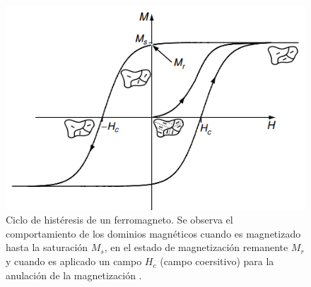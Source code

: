 \begin{figure}[!htp]
    \centering
    \includegraphics[scale=0.5]{Figuras/Hysteresis.png}
    \renewcommand{\figurename}{\textbf{Figura}}
    \renewcommand\thefigure{\textbf{\arabic{figure}}}
    \caption{Ciclo de histéresis de un ferromagneto. Se observa el comportamiento de los dominios magnéticos cuando es magnetizado hasta la saturación $M_s$, en el estado de magnetización remanente $M_r$ y cuando es aplicado un campo $H_c$ (campo coersitivo) para la anulación de la magnetización \cite{coey_2010}.}
    \label{fig:hysteresis}
\end{figure}

